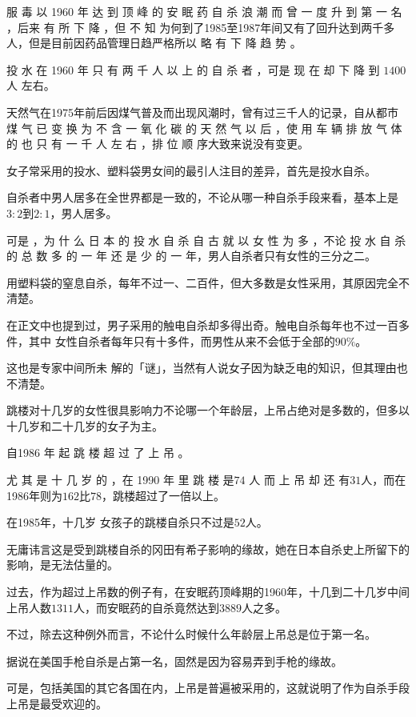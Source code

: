 \documentclass[UTF8]{ctexart}
\begin{document}
服 毒 以 1960 年 达 到 顶 峰 的 安 眠 药 自 杀 浪 潮 而 曾 一 度 升 到 第 一 名 ，后来 有 所 下 降 ，但 不 知 为何到了1985至1987年间又有了回升达到两千多人，但是目前因药品管理日趋严格所以 略 有 下 降 趋 势 。

投 水 在 1960 年 只 有 两 千 人 以 上 的 自 杀 者 ，可是 现 在 却 下 降 到 $1400$ 人 左右。

天然气在1975年前后因煤气普及而出现风潮时，曾有过三千人的记录，自从都市 煤 气 已 变 换 为 不 含 一 氧 化 碳 的 天 然 气 以 后 ，使 用 车 辆 排 放 气 体 的 也 只 有 一 千 人 左 右 ，排 位 顺 序大致来说没有变更。


女子常采用的投水、塑料袋男女间的最引人注目的差异，首先是投水自杀。

自杀者中男人居多在全世界都是一致的，不论从哪一种自杀手段来看，基本上是$3:2$到$2:1$，男人居多。

可是 ，为 什 么 日 本 的 投 水 自 杀 自 古 就 以 女 性 为 多 ，不论 投 水 自 杀 的 总 数 多 的 一 年 还 是 少 的 一 年，男人自杀者只有女性的三分之二。

用塑料袋的窒息自杀，每年不过一、二百件，但大多数是女性采用，其原因完全不清楚。

在正文中也提到过，男子采用的触电自杀却多得出奇。触电自杀每年也不过一百多件，其中 女性自杀者每年只有十多件，而男性从来不会低于全部的$90\%$。

这也是专家中间所未 解的「谜」，当然有人说女子因为缺乏电的知识，但其理由也不清楚。

跳楼对十几岁的女性很具影响力不论哪一个年龄层，上吊占绝对是多数的，但多以十几岁和二十几岁的女子为主。

自1986 年 起 跳 楼 超 过 了 上 吊 。

尤 其 是 十 几 岁 的 ，在 1990 年 里 跳 楼 是$74$ 人 而 上 吊 却 还 有$31$人，而在1986年则为$162$比$78$，跳楼超过了一倍以上。

在1985年，十几岁 女孩子的跳楼自杀只不过是$52$人。

无庸讳言这是受到跳楼自杀的冈田有希子影响的缘故，她在日本自杀史上所留下的影响，是无法估量的。

过去，作为超过上吊数的例子有，在安眠药顶峰期的1960年，十几到二十几岁中间上吊人数$1311$人，而安眠药的自杀竟然达到$3889$人之多。

不过，除去这种例外而言，不论什么时候什么年龄层上吊总是位于第一名。

据说在美国手枪自杀是占第一名，固然是因为容易弄到手枪的缘故。

可是，包括美国的其它各国在内，上吊是普遍被采用的，这就说明了作为自杀手段上吊是最受欢迎的。
\end{document}
